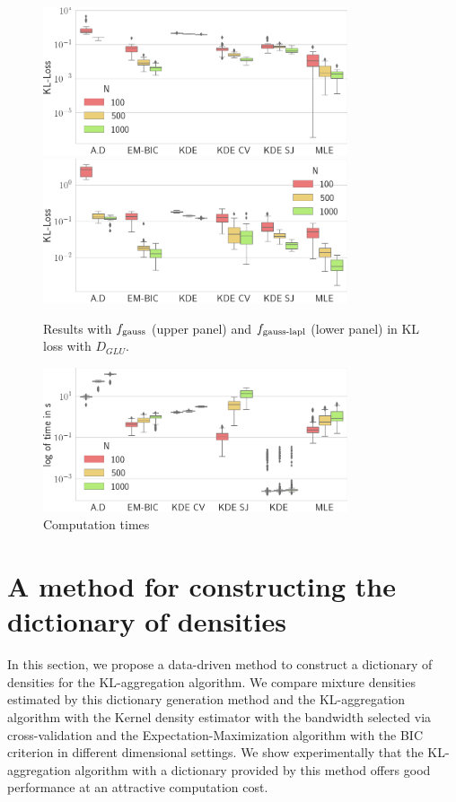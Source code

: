 \begin{figure}
\center
    \includegraphics[width=0.8\textwidth]{./TeX_files/res_gauss_KL_GLU.png}
    \includegraphics[width=0.8\textwidth]{./TeX_files/res_lapl_gauss_KL_GLU.png}
    \caption{Results with $f_{\textnormal{gauss}}$ (upper panel) and $f_{\textnormal{gauss-lapl}}$ 
    (lower panel) in KL loss with $D_{GLU}$.}
    \label{fig:res_ext_KL_GLU}
\end{figure} 


\begin{figure}
\center
    \includegraphics[width=0.8\textwidth]{./TeX_files/res_times.png}
    \caption{Computation times}
    \label{fig:res_times}
\end{figure}

\section{A method for constructing the dictionary of densities}

In this section, we propose a data-driven method to construct a dictionary of densities for the KL-aggregation algorithm. We compare mixture densities estimated by this dictionary generation method and the KL-aggregation algorithm with the Kernel density estimator with the bandwidth selected via cross-validation and the Expectation-Maximization algorithm with the BIC criterion in different dimensional settings. We show experimentally that the KL-aggregation algorithm with a dictionary provided by this method offers good performance at an attractive computation cost.

